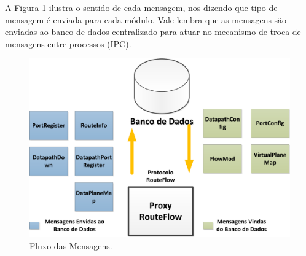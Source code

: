 A Figura \ref{fig:mensagens}
ilustra o sentido de cada mensagem, nos dizendo que tipo de mensagem
é enviada para cada módulo. Vale lembra que as mensagens
são enviadas ao banco de dados centralizado para atuar no
mecanismo de troca de mensagens entre processos (IPC).
\newline

\begin{figure}[h] 
\centering
\includegraphics[width=140mm]{mensagens.png}
\caption{Fluxo das Mensagens.}
\label{fig:mensagens} 
\end{figure}


